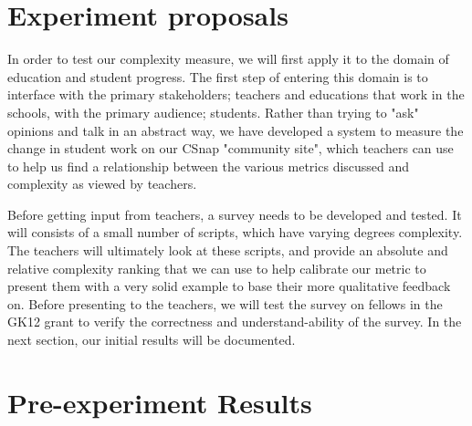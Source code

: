 \documentclass[]{article}
\begin{document}
\section{Experiment proposals}


In order to test our complexity measure, we will first apply it to the domain of education and student progress.
The first step of entering this domain is to interface with the primary stakeholders; teachers and educations that work in the schools, with the primary audience; students.
Rather than trying to "ask" opinions and talk in an abstract way, we have developed a system to measure the change in student work on our CSnap "community site", which teachers can use to help us find a relationship between the various metrics discussed and complexity as viewed by teachers.

Before getting input from teachers, a survey needs to be developed and tested.
It will consists of a small number of scripts, which have varying degrees complexity.
The teachers will ultimately look at these scripts, and provide an absolute and relative complexity ranking that we can use to help calibrate our metric to present them with a very solid example to base their more qualitative feedback on.
Before presenting to the teachers, we will test the survey on fellows in the GK12 grant to verify the correctness and understand-ability of the survey.
In the next section, our initial results will be documented.

\section{Pre-experiment Results}
\end{document}
